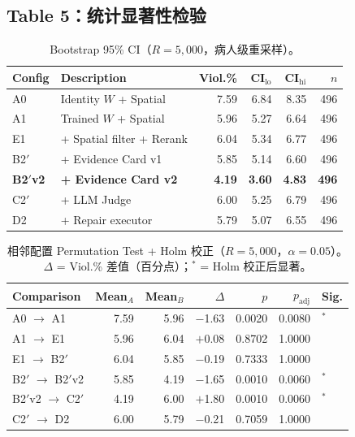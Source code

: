 \documentclass[11pt,a4paper]{article}
\theoremstyle{definition}
\begin{document}
\subsection{Table 5：统计显著性检验}

\begin{table}[H]
\centering
\caption{Bootstrap 95\% CI（$R=5{,}000$，病人级重采样）。}\label{tab:bootstrap_ci}
\small
\begin{tabular}{@{}l l r r r r@{}}
\toprule
\textbf{Config} & \textbf{Description} & \textbf{Viol.\%} & \textbf{CI$_{\mathrm{lo}}$} & \textbf{CI$_{\mathrm{hi}}$} & $n$ \\
\midrule
A0     & Identity $W$ + Spatial   & 7.59 & 6.84 & 8.35 & 496 \\
A1     & Trained $W$ + Spatial    & 5.96 & 5.27 & 6.64 & 496 \\
E1     & + Spatial filter + Rerank & 6.04 & 5.34 & 6.77 & 496 \\
B2$'$  & + Evidence Card v1       & 5.85 & 5.14 & 6.60 & 496 \\
\textbf{B2$'$v2} & \textbf{+ Evidence Card v2} & \textbf{4.19} & \textbf{3.60} & \textbf{4.83} & \textbf{496} \\
C2$'$  & + LLM Judge              & 6.00 & 5.25 & 6.79 & 496 \\
D2     & + Repair executor        & 5.79 & 5.07 & 6.55 & 496 \\
\bottomrule
\end{tabular}
\end{table}

\begin{table}[H]
\centering
\caption{相邻配置 Permutation Test + Holm 校正（$R=5{,}000$，$\alpha=0.05$）。$\Delta$ = Viol.\% 差值（百分点）；$^*$ = Holm 校正后显著。}\label{tab:pairwise}
\small
\begin{tabular}{@{}l r r r r r l@{}}
\toprule
\textbf{Comparison} & \textbf{Mean$_A$} & \textbf{Mean$_B$} & $\Delta$ & $p$ & $p_{\mathrm{adj}}$ & \textbf{Sig.} \\
\midrule
A0 $\to$ A1         & 7.59 & 5.96 & $-$1.63 & 0.0020 & 0.0080 & $^*$ \\
A1 $\to$ E1         & 5.96 & 6.04 & $+$0.08 & 0.8702 & 1.0000 &  \\
E1 $\to$ B2$'$      & 6.04 & 5.85 & $-$0.19 & 0.7333 & 1.0000 &  \\
B2$'$ $\to$ B2$'$v2 & 5.85 & 4.19 & $-$1.65 & 0.0010 & 0.0060 & $^*$ \\
B2$'$v2 $\to$ C2$'$ & 4.19 & 6.00 & $+$1.80 & 0.0010 & 0.0060 & $^*$ \\
C2$'$ $\to$ D2      & 6.00 & 5.79 & $-$0.21 & 0.7059 & 1.0000 &  \\
\bottomrule
\end{tabular}
\end{table}
\end{document}
